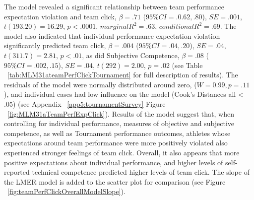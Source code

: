 \begin{landscape}
The model revealed a significant relationship between team performance expectation violation and team click, $\beta = .71$ ($95\% CI =  .0.62, .80$), $SE = .001$, $t(193.20) = 16.29$, $p < .0001$, $marginal R^2 = .63$, $conditional R^2 = .69$.
The model also indicated that individual performance expectation violation significantly predicted team click, $\beta = .004$ ($95\% CI =  .04, .20$), $SE = .04$, $t(311.7) = 2.81$, $p < .01$, as did Subjective Competence, $\beta = .08$ ($95\% CI =  .002, .15$), $SE = .04$, $t(292) = 2.00$, $p = .02$  (see Table ~\ref{tab:MLM31ateamPerfClickTournament} for full description of results).
The residuals of the model were normally distributed around zero, ($W = 0.99, p = .11$), and individual cases had low influence on the model (Cook's Distances all < .05) (see Appendix ~\ref{app5:tournamentSurvey} Figure ~\ref{fig:MLM31aTeamPerfExpClick}).
Results of the model suggest that, when controlling for individual performance, measures of objective and subjective competence, as well as Tournament performance outcomes, athletes whose expectations around team performance were more positively violated also experienced stronger feelings of team click. Overall, it also appears that more positive expectations about individual performance, and higher levels of self-reported technical competence predicted higher levels of team click.  The slope of the LMER model is added to the scatter plot for comparison (see Figure ~\ref{fig:teamPerfClickOverallModelSlope}).

   



\end{landscape}
